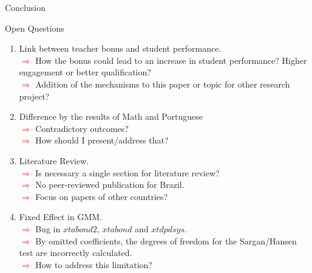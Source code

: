 \documentclass{beamer}
\begin{document}
\begin{frame}{Conclusion}
\begin{block}{\centering Open Questions}
\begin{enumerate}
\item \footnotesize Link between teacher bonus and student performance.
\\ \tiny \textcolor{red}{$\Longrightarrow$} How the bonus could lead to an increase in student performance? Higher engagement or better qualification?
\\ \tiny \textcolor{red}{$\Longrightarrow$} Addition of the mechanisms to this paper or topic for other research project?
\item \footnotesize Difference by the results of Math and Portuguese
\\ \tiny\textcolor{red}{$\Longrightarrow$} Contradictory outcomes?
\\ \tiny\textcolor{red}{$\Longrightarrow$} How should I present/address that?
\item \footnotesize Literature Review.
\\ \tiny\textcolor{red}{$\Longrightarrow$} Is necessary a single section for literature review?
\\ \tiny\textcolor{red}{$\Longrightarrow$} No peer-reviewed publication for Brazil.
\\ \tiny\textcolor{red}{$\Longrightarrow$} Focus on papers of other countries?
\item \footnotesize Fixed Effect in GMM.
\\ \tiny\textcolor{red}{$\Longrightarrow$} Bug in $xtabond2$, $xtabond$ and $xtdpdsys$.
\\ \tiny\textcolor{red}{$\Longrightarrow$} By omitted coefficients, the degrees of freedom for the Sargan/Hansen test are incorrectly calculated.
\\ \tiny\textcolor{red}{$\Longrightarrow$} How to address this limitation?
\end{enumerate}
\end{block}
\end{frame}
\end{document}
